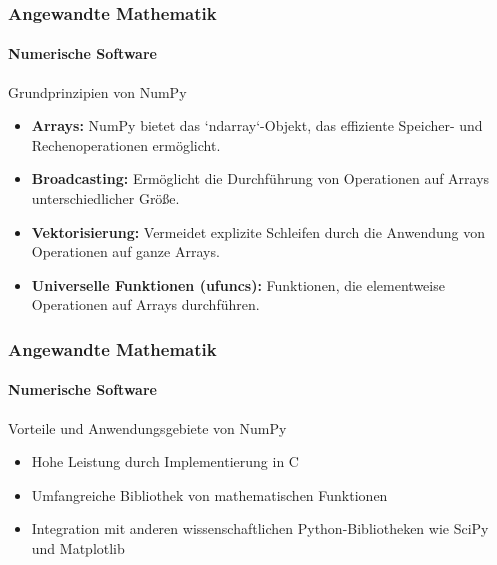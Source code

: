 \documentclass{beamer}
\begin{document}
\begin{frame}
    \frametitle{Angewandte Mathematik}
    \framesubtitle{Numerische Software}
    \begin{block}{Grundprinzipien von NumPy}
        \begin{itemize}
            \item \textbf{Arrays:} NumPy bietet das `ndarray`-Objekt, das effiziente Speicher- und Rechenoperationen ermöglicht.
            \item \textbf{Broadcasting:} Ermöglicht die Durchführung von Operationen auf Arrays unterschiedlicher Größe.
            \item \textbf{Vektorisierung:} Vermeidet explizite Schleifen durch die Anwendung von Operationen auf ganze Arrays.
            \item \textbf{Universelle Funktionen (ufuncs):} Funktionen, die elementweise Operationen auf Arrays durchführen.
        \end{itemize}
    \end{block}
\end{frame}

\begin{frame}
    \frametitle{Angewandte Mathematik}
    \framesubtitle{Numerische Software}
    \begin{block}{Vorteile und Anwendungsgebiete von NumPy}
            \begin{itemize}
                \item Hohe Leistung durch Implementierung in C
                \item Umfangreiche Bibliothek von mathematischen Funktionen
                \item Integration mit anderen wissenschaftlichen Python-Bibliotheken wie SciPy und Matplotlib
        \end{itemize}
    \end{block}
\end{frame}
\end{document}
